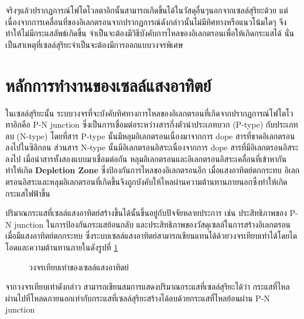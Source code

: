 \documentclass[a4paper,nobib,openany,10pt]{tufte-book}
\begin{document}
จริงๆแล้วปรากฏการณ์โฟโตโวลตาอิกนั้นสามารถเกิดขึ้นได้ในวัสดุอื่นๆนอกจากเซลล์สุริยะด้วย
แต่เนื่องจากการเคลื่อนที่ของอิเลกตรอนจากปรากฏการณ์ดังกล่าวนั้นไม่มีทิศทางหรือแนวโน้มใดๆ
จึงทำให้ไม่มีกระแสลัพธ์เกิดขึ้น
จำเป็นจะต้องมีวิธีบังคับการไหลของอิเลกตรอนเพื่อให้เกิดกระแสได้
นั่นเป็นสาเหตุที่เซลล์สุริยะจำเป็นจะต้องมีการออกแบบวงจรพิเศษ

\section{หลักการทำงานของเซลล์แสงอาทิตย์}
\label{sec:orged28f99}
ในเซลล์สุริยะนั้น
ระบบวงจรที่จะบังคับทิศทางการไหลของอิเลกตรอนที่เกิดจากปรากฏการณ์โฟโตโวทาอิกคือ
P-N junction ซึ่งเป็นการเชื่อมต่อระหว่างสารกึ่งตัวนำประเภทบวก (P-type)
กับประเภทลบ (N-type) โดยที่สาร P-type นั้นมีหลุมอิเลกตรอนเนื่องมาจากการ
dope สารที่ขาดอิเลกตรอนลงไปในซิลิกอน ส่วนสาร N-type
นั้นมีอิเลกตรอนอิสระเนื่องจากการ dope สารที่มีอิเลกตรอนอิสระลงไป
เมื่อนำสารทั้งสองแบบมาเชื่อมต่อกัน
หลุมอิเลกตรอนและอิเลกตรอนอิสระเคลื่อนที่เข้าหากันทำให้เกิด \textbf{Depletion
Zone} ซึ่งป้องกันการไหลของอิเลกตรอนอีก เมื่อแสงอาทิตย์ตกกระทบ
อิเลกตรอนอิสระและหลุมอิเลกตรอนที่เกิดขึ้นจึงถูกบังคับให้ไหลผ่านความต้านทานภายนอกซึ่งทำให้เกิดกระแสไฟฟ้าขึ้น

ปริมาณกระแสที่เซลล์แสงอาทิตย์สร้างขึ้นได้นั้นขึ้นอยู่กับปัจจัยหลายประการ
เช่น ประสิทธิภาพของ P-N junction ในการป้องกันกระแสย้อนกลับ
และประสิทธิภาพของวัสดุเซลล์ในการสร้างอิเลกตรอนเมื่อมีแสงอาทิตย์ตกกระทบ
ซึ่งระบบเซลล์แสงอาทิตย์สามารถเขียนแทนได้ด้วยวงจรเทียบเท่าได้โดยไดโอดและความต้านทานภายในดังรูปที่ \ref{fig: equiv circuit solar cell}


\begin{figure}[h]
  \centering
\caption{\label{fig: equiv circuit solar cell}วงจรเทียบเท่าของเซลล์แสงอาทิตย์}
\end{figure}

จากวงจรเทียบเท่าดังกล่าว
สามารถเขียนสมการแสดงปริมาณกระแสที่เซลล์สุริยะได้ว่า
กระแสที่ไหลผ่านไปที่โหลดภายนอกเท่ากับกระแสที่เซลล์สุริยะสร้างได้ลบด้วยกระแสที่ไหลย้อนผ่าน
P-N junction
\end{document}
